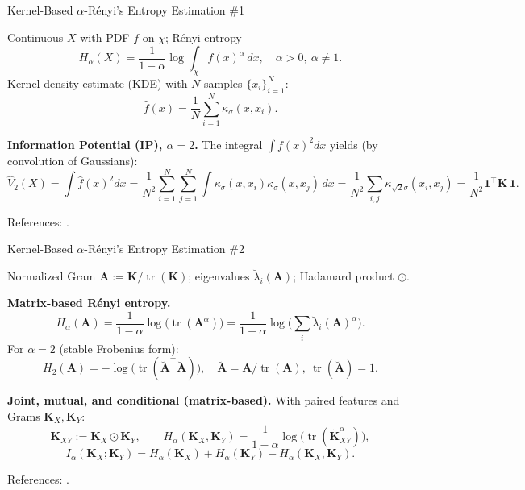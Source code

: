 \documentclass[aspectratio=169]{beamer}
\let\oldcite\cite %
\renewcommand{\cite}[1]{{\tiny\oldcite{#1}}}
\begin{document}
\begin{frame}{Kernel-Based $\alpha$-Rényi's Entropy Estimation \#1}

Continuous $X$ with PDF $f$ on $\chi$; Rényi entropy
\[
H_{\alpha}(X)=\frac{1}{1-\alpha}\log\!\int_{\chi} f(x)^{\alpha}\,dx,\quad \alpha>0,\ \alpha\neq 1.
\]
Kernel density estimate (KDE) with $N$ samples $\{x_i\}_{i=1}^{N}$:
\[
\hat f(x)=\frac{1}{N}\sum_{i=1}^{N}\kappa_\sigma(x,x_i).
\]

\medskip
\textbf{Information Potential (IP), $\alpha=2$.}
The integral $\int f(x)^2dx$ yields (by convolution of Gaussians):
\[
\hat V_2(X)=\int \hat f(x)^2dx
=\frac{1}{N^2}\sum_{i=1}^{N}\sum_{j=1}^{N}\int \kappa_\sigma(x,x_i)\kappa_\sigma(x,x_j)\,dx
=\frac{1}{N^2}\sum_{i,j}\kappa_{\sqrt{2}\sigma}(x_i,x_j)=\frac{1}{N^2}\mathbf{1}^\top \mathbf{K}\,\mathbf{1}.
\]

\footnotesize References: \cite{principe2010information,silverman2018density,bromiley2003products,xu2008reproducing}.
\end{frame}



\begin{frame}{Kernel-Based $\alpha$-Rényi's Entropy Estimation \#2}

Normalized Gram $\mathbf{A}:=\mathbf{K}/\operatorname{tr}(\mathbf{K})$; eigenvalues $\breve\lambda_i(\mathbf{A})$;
Hadamard product $\odot$.

\medskip
\textbf{Matrix-based Rényi entropy.}
\[
H_{\alpha}(\mathbf{A})=\frac{1}{1-\alpha}\log\!\big(\operatorname{tr}(\mathbf{A}^{\alpha})\big)
=\frac{1}{1-\alpha}\log\!\Big(\sum_i \breve\lambda_i(\mathbf{A})^{\alpha}\Big).
\]
For $\alpha=2$ (stable Frobenius form):
\[
H_2(\mathbf{A})=-\log\!\big(\operatorname{tr}(\breve{\mathbf{A}}^\top\breve{\mathbf{A}})\big),
\quad \breve{\mathbf{A}}=\mathbf{A}/\operatorname{tr}(\mathbf{A}),\ \operatorname{tr}(\breve{\mathbf{A}})=1.
\]

\medskip
\textbf{Joint, mutual, and conditional (matrix-based).}
With paired features and Grams $\mathbf{K}_X,\mathbf{K}_Y$:
\[
\mathbf{K}_{XY}:=\mathbf{K}_{X}\odot \mathbf{K}_{Y},\qquad
H_{\alpha}(\mathbf{K}_X,\mathbf{K}_Y)=\frac{1}{1-\alpha}\log\!\big(\operatorname{tr}(\breve{\mathbf{K}}_{XY}^{\alpha})\big),
\]
\[
I_{\alpha}(\mathbf{K}_X;\mathbf{K}_Y)=H_{\alpha}(\mathbf{K}_X)+H_{\alpha}(\mathbf{K}_Y)-H_{\alpha}(\mathbf{K}_X,\mathbf{K}_Y).
\]

\footnotesize References: \cite{giraldo2014measures,giraldo2013information}.
\end{frame}
\end{document}
